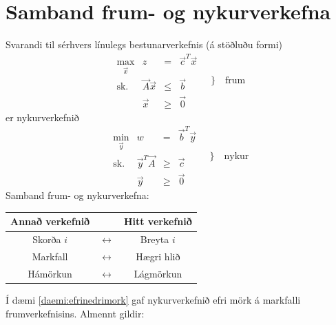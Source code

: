 \section{Samband frum- og nykurverkefna}
Svarandi til sérhvers línulegs bestunarverkefnis (á stöðluðu formi) 
\[\begin{array}{lcccc}
 \max_{\vec{x}} &z& =& \vec{c}^T\vec{x}\\
 \mbox{sk.}& \vec{A}\vec{x}&\leq&\vec{b}\\
 &\vec{x}&\geq&\vec{0}
\end{array}\quad\Bigg\}\quad\textrm{frum}\]
er nykurverkefnið
\[\begin{array}{lcccc}
 \min_{\vec{y}} &w& =& \vec{b}^T\vec{y}\\
 \mbox{sk.}& \vec{y}^T\vec{A}&\geq&\vec{c}\\
 &\vec{y}&\geq&\vec{0}
\end{array}\quad\Bigg\}\quad\textrm{nykur}\]
Samband frum- og nykurverkefna:

\begin{center}
\begin{tabular}{|ccc|}\hline 
Annað verkefnið && Hitt verkefnið \\ \hline
Skorða $i$ & $\leftrightarrow$ & Breyta $i$ \\
Markfall & $\leftrightarrow$ & Hægri hlið \\
Hámörkun & $\leftrightarrow$ & Lágmörkun  \\ \hline
\end{tabular}
\end{center}

Í dæmi \ref{daemi:efrinedrimork} gaf nykurverkefnið efri mörk á markfalli frumverkefnisins. Almennt gildir:

